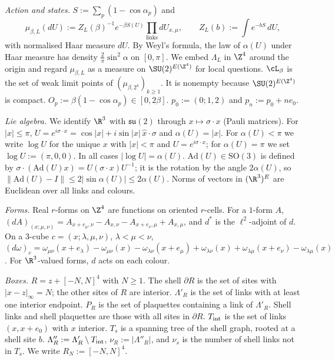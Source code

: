 \emph{Action and states.} $S:=\sum_p(1-\cos\alpha_p)$ and
\[
\mu_{\beta,L}(dU):=Z_L(\beta)^{-1}e^{-\beta S(U)}\prod_{\text{links}}dU_{x,\mu},\qquad Z_L(b):=\int e^{-bS}\,dU,
\]
with normalised Haar measure $dU$. By Weyl's formula, the law of $\alpha(U)$ under Haar measure has density $\tfrac2\pi\sin^2\alpha$ on $[0,\pi]$.
We embed $\Lambda_L$ in $\Z^4$ around the origin and regard $\mu_{\beta,L}$ as a measure on $\SU(2)^{E(\Z^4)}$ for local questions.
$\cL_\beta$ is the set of weak limit points of $(\mu_{\beta,2^k})_{k\ge1}$. It is nonempty because $\SU(2)^{E(\Z^4)}$ is compact.
$O_p:=\beta(1-\cos\alpha_p)\in[0,2\beta]$. $p_0:=(0;1,2)$ and $p_n:=p_0+ne_0$.

\emph{Lie algebra.} We identify $\R^3$ with $\mathfrak{su}(2)$ through $x\mapsto\sigma\cdot x$ (Pauli matrices). For $|x|\le\pi$, $U=e^{i\sigma\cdot x}=\cos|x|+i\sin|x|\,\hat x\cdot\sigma$ and $\alpha(U)=|x|$. For $\alpha(U)<\pi$ we write $\log U$ for the unique $x$ with $|x|<\pi$ and $U=e^{i\sigma\cdot x}$; for $\alpha(U)=\pi$ we set $\log U:=(\pi,0,0)$. In all cases $|\log U|=\alpha(U)$. $\mathrm{Ad}(U)\in\mathrm{SO}(3)$ is defined by $\sigma\cdot(\mathrm{Ad}(U)x)=U(\sigma\cdot x)U^{-1}$; it is the rotation by the angle $2\alpha(U)$, so $\|\mathrm{Ad}(U)-I\|\le2|\sin\alpha(U)|\le2\alpha(U)$.
Norms of vectors in $(\R^3)^E$ are Euclidean over all links and colours.

\emph{Forms.} Real $r$-forms on $\Z^4$ are functions on oriented $r$-cells. For a $1$-form $A$, $(dA)_{(x;\mu,\nu)}=A_{x+e_\mu,\nu}-A_{x,\nu}-A_{x+e_\nu,\mu}+A_{x,\mu}$, and $d^*$ is the $\ell^2$-adjoint of $d$. On a $3$-cube $c=(x;\lambda,\mu,\nu)$, $\lambda<\mu<\nu$,
$(d\omega)_c=\omega_{\mu\nu}(x+e_\lambda)-\omega_{\mu\nu}(x)-\omega_{\lambda\nu}(x+e_\mu)+\omega_{\lambda\nu}(x)+\omega_{\lambda\mu}(x+e_\nu)-\omega_{\lambda\mu}(x)$.
For $\R^3$-valued forms, $d$ acts on each colour.

\emph{Boxes.} $R=z+[-N,N]^4$ with $N\ge1$. The shell $\partial R$ is the set of sites with $|x-z|_\infty=N$; the other sites of $R$ are interior. $\Lambda'_R$ is the set of links with at least one interior endpoint. $P_R$ is the set of plaquettes containing a link of $\Lambda'_R$. Shell links and shell plaquettes are those with all sites in $\partial R$. $T_{\rm int}$ is the set of links $(x,x+e_0)$ with $x$ interior. $T_s$ is a spanning tree of the shell graph, rooted at a shell site $b$. $\Lambda''_R:=\Lambda'_R\setminus T_{\rm int}$, $\nu_R:=|\Lambda''_R|$, and $\nu_s$ is the number of shell links not in $T_s$. We write $R_N:=[-N,N]^4$.

